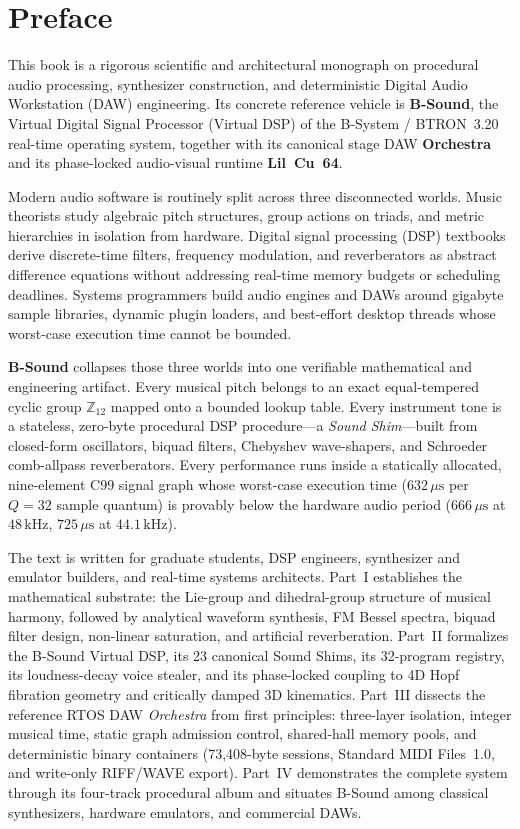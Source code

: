 \chapter{Preface}

This book is a rigorous scientific and architectural monograph on procedural audio processing, synthesizer construction, and deterministic Digital Audio Workstation (DAW) engineering. Its concrete reference vehicle is \textbf{B-Sound}, the Virtual Digital Signal Processor (Virtual DSP) of the B-System / BTRON~3.20 real-time operating system, together with its canonical stage DAW \textbf{Orchestra} and its phase-locked audio-visual runtime \textbf{Lil~Cu~64}.

Modern audio software is routinely split across three disconnected worlds. Music theorists study algebraic pitch structures, group actions on triads, and metric hierarchies in isolation from hardware. Digital signal processing (DSP) textbooks derive discrete-time filters, frequency modulation, and reverberators as abstract difference equations without addressing real-time memory budgets or scheduling deadlines. Systems programmers build audio engines and DAWs around gigabyte sample libraries, dynamic plugin loaders, and best-effort desktop threads whose worst-case execution time cannot be bounded.

\textbf{B-Sound} collapses those three worlds into one verifiable mathematical and engineering artifact. Every musical pitch belongs to an exact equal-tempered cyclic group $\mathbb{Z}_{12}$ mapped onto a bounded lookup table. Every instrument tone is a stateless, zero-byte procedural DSP procedure—a \emph{Sound Shim}—built from closed-form oscillators, biquad filters, Chebyshev wave-shapers, and Schroeder comb-allpass reverberators. Every performance runs inside a statically allocated, nine-element C99 signal graph whose worst-case execution time ($632\,\mu\text{s}$ per $Q=32$ sample quantum) is provably below the hardware audio period ($666\,\mu\text{s}$ at $48\,\text{kHz}$, $725\,\mu\text{s}$ at $44.1\,\text{kHz}$).

The text is written for graduate students, DSP engineers, synthesizer and emulator builders, and real-time systems architects. Part~I establishes the mathematical substrate: the Lie-group and dihedral-group structure of musical harmony, followed by analytical waveform synthesis, FM Bessel spectra, biquad filter design, non-linear saturation, and artificial reverberation. Part~II formalizes the B-Sound Virtual DSP, its 23 canonical Sound Shims, its 32-program registry, its loudness-decay voice stealer, and its phase-locked coupling to 4D Hopf fibration geometry and critically damped 3D kinematics. Part~III dissects the reference RTOS DAW \emph{Orchestra} from first principles: three-layer isolation, integer musical time, static graph admission control, shared-hall memory pools, and deterministic binary containers (73,408-byte sessions, Standard MIDI Files~1.0, and write-only RIFF/WAVE export). Part~IV demonstrates the complete system through its four-track procedural album and situates B-Sound among classical synthesizers, hardware emulators, and commercial DAWs.

